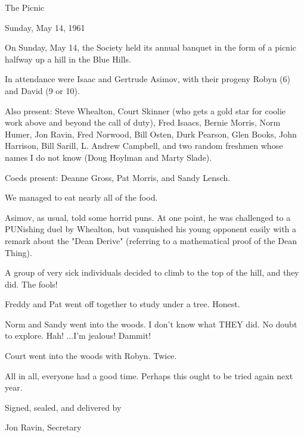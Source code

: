 \documentclass[12pt]{article}
\begin{document}
\begin{center}

The Picnic

Sunday, May 14, 1961

\end{center}
 
\vspace{12pt}

\setlength{\parskip}{6pt}

\noindent
On Sunday, May 14, the Society held its annual banquet in the form of a picnic halfway up a hill in the Blue Hills.

In attendance were Isaac and Gertrude Asimov, with their progeny Robyn (6) and David (9 or 10).

Also present: Steve Whealton, Court Skinner (who gets a gold star for coolie work above and beyond the call of duty), Fred Isaacs, Bernie Morris, Norm Humer, Jon Ravin, Fred Norwood, Bill Osten, Durk Pearson, Glen Books, John Harrison, Bill Sarill, L. Andrew Campbell, and two random freshmen whose names I do not know (Doug Hoylman and Marty Slade).

Coeds present: Deanne Gross, Pat Morris, and Sandy Lensch.

We managed to eat nearly all of the food.

Asimov, as usual, told some horrid puns. At one point, he was challenged to a PUNishing duel by Whealton, but vanquished his young opponent easily with a remark about the "Dean Derive" (referring to a mathematical proof of the Dean Thing).

A group of very sick individuals decided to climb to the top of the hill, and they did. The fools!

Freddy and Pat went off together to study under a tree. Honest.

Norm and Sandy went into the woods. I don't know what THEY did. No doubt to explore. Hah! ...I'm jealous! Dammit!

Court went into the woods with Robyn. Twice.

All in all, everyone had a good time. Perhaps this ought to be tried again next year.

\vspace{12pt}

\centerline{Signed, sealed, and delivered by}
\centerline{Jon Ravin, Secretary}
\end{document}
